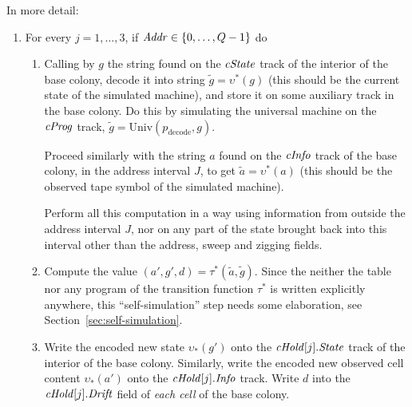 \documentclass[12pt]{memoir}
\newcommand{\fld}[1]{\ensuremath{\textit{#1\/}}}
\newcommand{\Addr}{\fld{Addr}}
\newcommand{\cAddr}{\fld{cAddr}}
\newcommand{\Drift}{\fld{Drift}}
\newcommand{\cHold}{\fld{cHold}}
\newcommand{\Info}{\fld{Info}}
\newcommand{\cInfo}{\fld{cInfo}}
\newcommand{\cKind}{\fld{cKind}}
\newcommand{\cProg}{\fld{cProg}}
\newcommand{\State}{\fld{State}}
\newcommand{\cState}{\fld{cState}}
\newcommand{\decode}{\mathrm{decode}}
\newcommand{\Member}{\mathrm{Member}}
\newcommand{\Un}{\mathrm{Univ}}
\begin{document}
In more detail:
\begin{enumerate}

      \item For every \( j=1,\dots,3 \), if \( \Addr \in \set{0, \dots, Q-1} \) do 

       \begin{enumerate}

          \item Calling by \( g \) the  string found on the \( \cState \) track of
            the interior of the base colony,
            decode it into string \( \tilde g=\upsilon^{*}(g) \)
            (this should be the current state of the simulated machine), and
            store it on some auxiliary track in the base colony.
            Do this by simulating the universal machine on the \( \cProg \) track,
            \( \tilde g = \Un(p_{\decode}, g) \).

            Proceed similarly with the string \( a \) found on the \( \cInfo \)
            track of the base colony, in the address interval \( J \), 
            to get \( \tilde a = \upsilon^{*}(a) \)
            (this should be the observed tape symbol of the simulated machine).

            Perform all this computation in a way using information from outside
            the address interval \( J \), nor on any 
            part of the state brought back into this interval other than the address,
            sweep and zigging fields.

          \item \label{i:comp.trans}
           Compute the value \( (a',g',d)=\tau^{*}(\tilde a, \tilde g) \).
Since the neither the table nor any program of the transition 
function \( \tau^{*} \) is written explicitly anywhere, this ``self-simulation'' step needs
some elaboration, see Section~\ref{sec:self-simulation}.

            \item\label{i:comp.write}
              Write the encoded new state \( \upsilon_{*}(g') \) onto the
              \( \cHold[j].\State \) track of the interior of the base colony.
              Similarly, write the encoded new observed cell
              content \( \upsilon_{*}(a') \) onto the \( \cHold[j].\Info \) track.
              Write \( d \) into the \( \cHold[j].\Drift \) field of \emph{each cell} of
              the base colony.


\end{enumerate}
\end{enumerate}
\end{document}
